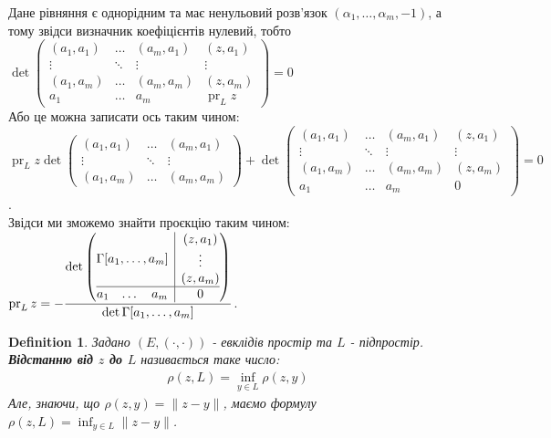 \documentclass[a4paper, 10pt]{article}
\theoremstyle{theoremdd}
\newtheorem{definition}[theorem]{Definition}
\DeclareMathOperator{\pr}{pr}
\begin{document}
Дане рівняння є однорідним та має ненульовий розв'язок $(\alpha_1,\dots,\alpha_m,-1)$, а тому звідси визначник коефіцієнтів нулевий, тобто\\
$\det \begin{pmatrix}
(a_1,a_1) & \dots & (a_m,a_1) & (z,a_1) \\
\vdots & \ddots & \vdots & \vdots \\
(a_1,a_m) & \dots & (a_m,a_m) & (z,a_m) \\
a_1 & \dots & a_m & \pr_L z
\end{pmatrix} = 0$\\
Або це можна записати ось таким чином:\\
$\pr_L z \det \begin{pmatrix}
(a_1,a_1) & \dots & (a_m,a_1) \\
\vdots & \ddots & \vdots \\
(a_1,a_m) & \dots & (a_m,a_m)
\end{pmatrix} + \det \begin{pmatrix}
(a_1,a_1) & \dots & (a_m,a_1) & (z,a_1) \\
\vdots & \ddots & \vdots & \vdots \\
(a_1,a_m) & \dots & (a_m,a_m) & (z,a_m) \\
a_1 & \dots & a_m & 0
\end{pmatrix} = 0$.\\
Звідси ми зможемо знайти проєкцію таким чином:\\
$\pr_L z = -\dfrac{\det \left(\begin{array}{@{}c|c@{}}
\Gamma[a_1,\dots,a_m] & \begin{matrix} (z,a_1) \\ \vdots \\ (z,a_m) \end{matrix} \\
\hline
\begin{matrix} a_1 & \dots & a_m \end{matrix} & 0
\end{array}\right)}{\det\Gamma[a_1,\dots,a_m]}$.

\begin{definition}
Задано $(E,(\cdot,\cdot))$ - евклідів простір та $L$ - підпростір.\\
\textbf{Відстанню від $z$ до $L$} називається таке число:
\begin{align*}
\rho (z,L) = \inf_{y \in L} \rho(z,y)
\end{align*}
Але, знаючи, що $\rho(z,y) = \| z-y \|$, маємо формулу $\rho(z,L) =\displaystyle \inf_{y \in L} \| z-y\|$.
\end{definition}
\end{document}
